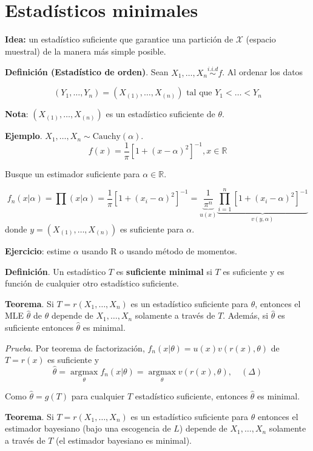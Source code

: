 \documentclass[
  12pt,
]{book}
\begin{document}
\hypertarget{estaduxedsticos-minimales}{%
\section{Estadísticos minimales}\label{estaduxedsticos-minimales}}

\textbf{Idea:} un estadístico suficiente que garantice una partición de \(\mathcal X\)
(espacio muestral) de la manera más simple posible.

\textbf{Definición (Estadístico de orden)}. Sean \(X_1,\dots, X_n \stackrel{i.i.d}{\sim} f\). Al ordenar los datos

\[(Y_1,\dots,Y_n) = (X_{(1)},\dots,X_{(n)}) \text { tal
que } Y_1<\dots<Y_n\]

\textbf{Nota}: \((X_{(1)},\dots,X_{(n)})\) es un estadístico suficiente de \(\theta\).

\textbf{Ejemplo}. \(X_1,\dots, X_n \sim \text{Cauchy}(\alpha)\).
\[ f(x) = \dfrac1\pi[1+(x-\alpha)^2]^{-1}, x\in\mathbb R\]

Busque un estimador suficiente para \(\alpha \in \mathbb R\).

\[ f_n(x|\alpha) = \prod(x|\alpha) = \dfrac 1\pi [1+(x_i-\alpha)^2]^{-1} = \underbrace{\dfrac 1{\pi^n}}_{u(x)}\underbrace{\prod_{i=1}^n[1+(x_i-\alpha)^2]^{-1} }_{v(y,\alpha)} \]
donde \(y = (X_{(1)},\dots,X_{(n)})\) es suficiente para \(\alpha\).

\textbf{Ejercicio}: estime \(\alpha\) usando R o usando método de momentos.

\textbf{Definición}. Un estadístico \(T\) es \textbf{suficiente minimal} si \(T\) es
suficiente y es función de cualquier otro estadístico suficiente.

\textbf{Teorema}. Si \(T = r(X_1,\dots, X_n)\) es un estadístico suficiente para
\(\theta\), entonces el MLE \(\hat\theta\) de \(\theta\) depende de \(X_1,\dots, X_n\)
solamente a través de \(T\). Además, si \(\hat \theta\) es suficiente entonces \(\hat \theta\) es minimal.

\emph{Prueba}. Por teorema de factorización, \(f_n(x|\theta) = u(x)v(r(x),\theta)\) de \(T =r(x)\)
es suficiente y
\[\hat\theta = \operatorname*{argmax}_\theta f_n(x|\theta) = \operatorname*{argmax}_\theta v(r(x),\theta), \quad (\Delta)\]

Como \(\hat\theta = g(T)\) para cualquier \(T\) estadístico suficiente, entonces \(\hat\theta\) es minimal.

\textbf{Teorema}. Si \(T = r(X_1,\dots, X_n)\) es un estadístico suficiente para
\(\theta\) entonces el estimador bayesiano (bajo una escogencia de \(L\)) depende de
\(X_1,\dots, X_n\) solamente a través de \(T\) (el estimador bayesiano es minimal).
\end{document}
